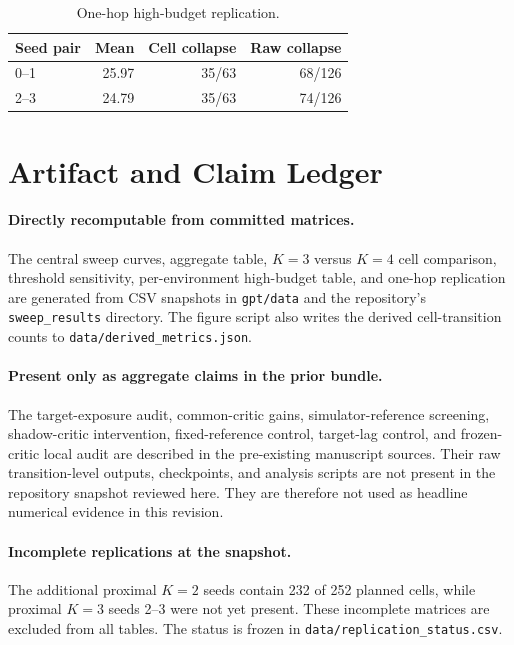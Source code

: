 \begin{table}[H]
\centering
\caption{One-hop high-budget replication.}
\label{tab:k1_replication}
\footnotesize
\begin{tabular}{lrrr}
\toprule
Seed pair&Mean&Cell collapse&Raw collapse\\
\midrule
0--1&25.97&35/63&68/126\\
2--3&24.79&35/63&74/126\\
\bottomrule
\end{tabular}
\end{table}

\section{Artifact and Claim Ledger}
\label{app:ledger}

\paragraph{Directly recomputable from committed matrices.}
The central sweep curves, aggregate table, $K=3$ versus $K=4$ cell comparison, threshold sensitivity, per-environment high-budget table, and one-hop replication are generated from CSV snapshots in \texttt{gpt/data} and the repository's \texttt{sweep\_results} directory. The figure script also writes the derived cell-transition counts to \texttt{data/derived\_metrics.json}.

\paragraph{Present only as aggregate claims in the prior bundle.}
The target-exposure audit, common-critic gains, simulator-reference screening, shadow-critic intervention, fixed-reference control, target-lag control, and frozen-critic local audit are described in the pre-existing manuscript sources. Their raw transition-level outputs, checkpoints, and analysis scripts are not present in the repository snapshot reviewed here. They are therefore not used as headline numerical evidence in this revision.

\paragraph{Incomplete replications at the snapshot.}
The additional proximal $K=2$ seeds contain 232 of 252 planned cells, while proximal $K=3$ seeds 2--3 were not yet present. These incomplete matrices are excluded from all tables. The status is frozen in \texttt{data/replication\_status.csv}.

